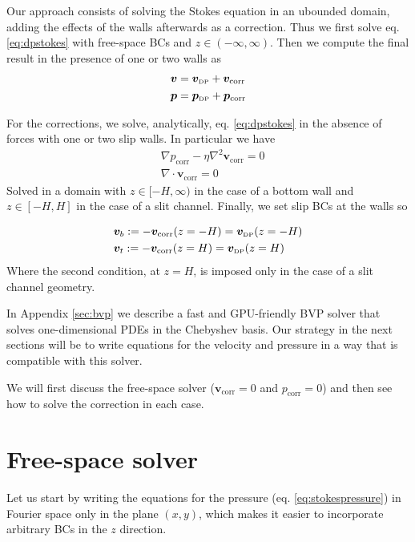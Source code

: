 \documentclass[ twoside,openright,titlepage,numbers=noenddot,%
headinclude,footinclude,cleardoublepage=empty,abstract=on,
BCOR=5mm,paper=a4,fontsize=11pt, dvipsnames
]{scrreprt}
\renewcommand{\vec}[1]{\bm{#1}}
\newcommand{\gpu}{\gls{GPU}\xspace}
\newcommand{\fvel}{v}
\newcommand{\corr}{\text{corr}}
\newcommand{\dpr}{\text{\tiny DP}}
\begin{document}
Our approach consists of solving the Stokes equation in an ubounded domain, adding the effects of the walls afterwards as a correction. Thus we first solve eq. \eqref{eq:dpstokes} with free-space \glspl{BC} and $z\in (-\infty, \infty)$. Then we compute the final result in the presence of one or two walls as
\begin{equation}
  \label{eq:dpstokescorrsum}
  \begin{aligned}
  &\vec{\fvel} =   \vec{\fvel}_{\dpr} +   \vec{\fvel}_{\corr}\\
  &\vec{p} =   \vec{p}_{\dpr} +   \vec{p}_{\corr}
\end{aligned}
\end{equation}

For the corrections, we solve, analytically, eq. \eqref{eq:dpstokes} in the absence of forces with one or two slip walls. In particular we have
\begin{equation}
  \label{eq:dpstokescorr}
\begin{aligned}
    &\nabla p_{\corr} - \eta\nabla^2\vec{\fvel}_{\corr} = 0\\
    &\nabla\cdot\vec{\fvel}_{\corr} = 0  
\end{aligned}
\end{equation}
Solved in a domain with $z\in [-H,\infty)$ in the case of a bottom wall and $z\in [-H, H]$ in the case of a slit channel. Finally, we set slip \glspl{BC} at the walls so

\begin{equation}
  \label{eq:dpstokescorrbcs}
  \begin{aligned}
    &\vec{\fvel}_b:=-\vec{\fvel}_{\corr}(z=-H) = \vec{\fvel}_{\dpr}(z=-H)\\
    &\vec{\fvel}_t:=-\vec{\fvel}_{\corr}(z=H) = \vec{\fvel}_{\dpr}(z=H)    
\end{aligned}
\end{equation}
Where the second condition, at $z=H$, is imposed only in the case of a slit channel geometry.

In Appendix \ref{sec:bvp} we describe a fast and \gpu-friendly \gls{BVP} solver that solves one-dimensional \glspl{PDE} in the Chebyshev basis. Our strategy in the next sections will be to write equations for the velocity and pressure in a way that is compatible with this solver.


We will first discuss the free-space solver ($\vec{\fvel}_{\corr} = 0$ and $p_\corr=0$) and then see how to solve the correction in each case. 
\section{Free-space solver}
Let us start by writing the equations for the pressure (eq. \eqref{eq:stokespressure}) in Fourier space only in the plane $(x,y)$, which makes it easier to incorporate arbitrary \glspl{BC} in the $z$ direction.
\end{document}
